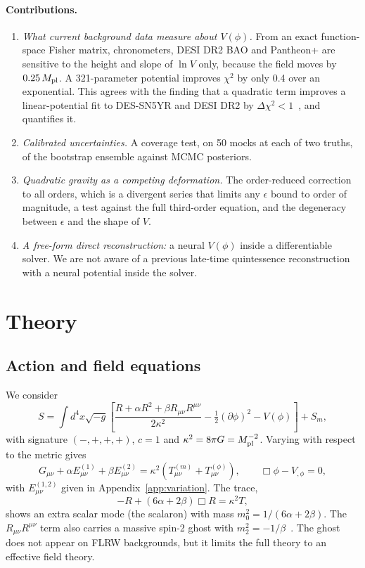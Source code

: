 \documentclass[11pt,a4paper]{article}
\newcommand{\Mpl}{M_{\rm pl}}
\begin{document}
\paragraph{Contributions.}
\begin{enumerate}
\item \emph{What current background data measure about $V(\phi)$.} From an exact function-space Fisher matrix, chronometers, DESI DR2 BAO and Pantheon+ are sensitive to the height and slope of $\ln V$ only, because the field moves by $0.25\,\Mpl$. A 321-parameter potential improves $\chi^2$ by only 0.4 over an exponential. This agrees with the finding that a quadratic term improves a linear-potential fit to DES-SN5YR and DESI DR2 by $\Delta\chi^2<1$~\cite{2505.10662}, and quantifies it.
\item \emph{Calibrated uncertainties.} A coverage test, on 50 mocks at each of two truths, of the bootstrap ensemble against MCMC posteriors.
\item \emph{Quadratic gravity as a competing deformation.} The order-reduced correction to all orders, which is a divergent series that limits any $\epsilon$ bound to order of magnitude, a test against the full third-order equation, and the degeneracy between $\epsilon$ and the shape of $V$.
\item \emph{A free-form direct reconstruction:} a neural $V(\phi)$ inside a differentiable solver. We are not aware of a previous late-time quintessence reconstruction with a neural potential inside the solver.\end{enumerate}

\section{Theory}\label{sec:theory}
\subsection{Action and field equations}
We consider
\begin{equation}
S=\int d^4x\sqrt{-g}\left[\frac{R+\alpha R^2+\beta R_{\mu\nu}R^{\mu\nu}}{2\kappa^2}-\tfrac12(\partial\phi)^2-V(\phi)\right]+S_m ,
\label{eq:action}
\end{equation}
with signature $(-,+,+,+)$, $c=1$ and $\kappa^2=8\pi G=\Mpl^{-2}$. Varying with respect to the metric gives
\begin{equation}
G_{\mu\nu}+\alpha E^{(1)}_{\mu\nu}+\beta E^{(2)}_{\mu\nu}=\kappa^2\left(T^{(m)}_{\mu\nu}+T^{(\phi)}_{\mu\nu}\right),\qquad \Box\phi-V_{,\phi}=0,
\end{equation}
with $E^{(1,2)}_{\mu\nu}$ given in Appendix~\ref{app:variation}. The trace,
\begin{equation}
-R+(6\alpha+2\beta)\Box R=\kappa^2T,
\end{equation}
shows an extra scalar mode (the scalaron) with mass $m_0^2=1/(6\alpha+2\beta)$.
The $R_{\mu\nu}R^{\mu\nu}$ term also carries a massive spin-2 ghost with $m_2^2=-1/\beta$~\cite{Stelle1977}. The ghost does not appear on FLRW backgrounds, but it limits the full theory to an effective field theory.
\end{document}
